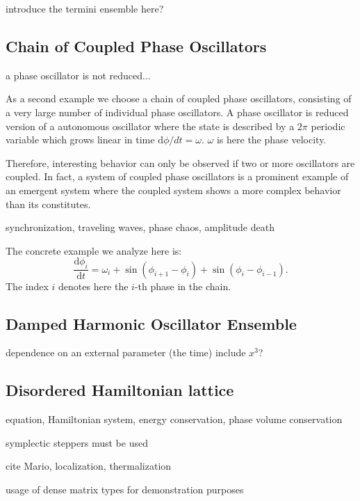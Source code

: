 \documentclass[1p]{elsarticle}
\newcommand {\de} {\mbox{d}}
\begin{document}
introduce the termini ensemble here?

\subsection{Chain of Coupled Phase Oscillators}

a phase oscillator is not reduced...

As a second example we choose a chain of coupled phase oscillators, consisting of a very large number of individual phase oscillators. A phase oscillator is reduced version of a autonomous oscillator where the state
is described by a $2\pi$ periodic variable \cite{Pikovsky-Rosenblum,Kuramoto,scholarpedia articles} which grows linear in time $\de \phi/dt = \omega$. $\omega$ is here the phase velocity. 

Therefore, interesting behavior can only
be observed if two or more oscillators are coupled. In fact, a system of
coupled phase oscillators is a prominent example of an emergent system where
the coupled system shows a more complex behavior than its constitutes.

synchronization, traveling waves, phase chaos, amplitude death


The concrete example we analyze here is:
\begin{equation}
    \frac{\de \phi_i}{\de t} = \omega_i + \sin( \phi_{i+1} - \phi_i) + \sin( \phi_i
    - \phi_{i-1}).
\end{equation}
The index $i$ denotes here the $i$-th phase in the chain.



\subsection{Damped Harmonic Oscillator Ensemble}

dependence on an external parameter (the time)
include $x^3$?

\subsection{Disordered Hamiltonian lattice}

equation, Hamiltonian system, energy conservation, phase volume conservation

symplectic steppers must be used

cite Mario, localization, thermalization

usage of dense matrix types for demonstration purposes
\end{document}
